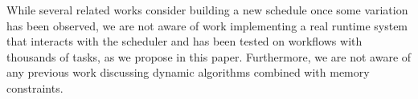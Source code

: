 \documentclass[conference]{IEEEtran}
\newcommand{\AB}[1]{{\color{purple}[AB: #1]}}
\begin{document}
While several related works consider building a new schedule once some variation has been observed,
we are not aware of work implementing a real runtime system that interacts with the scheduler
and has been tested on workflows with thousands of tasks, as we propose in this paper. Furthermore, 
we are not aware of any previous work discussing dynamic algorithms combined with memory constraints. 

%
%
%
%
%
%
%
%
%
%
%
%
%
\end{document}
